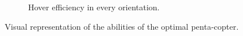 \begin{figure}[!ht]
{\begin{subfigure}[b]{0.48\textwidth}
    \caption{Hover efficiency in every orientation.} \label{fig:penta_hspace}
  \end{subfigure}}
  \caption{Visual representation of the abilities of the optimal penta-copter.}
  \label{fig:Pentacopter_spaces}
\end{figure}

\begin{figure}[!ht]
\end{figure}
